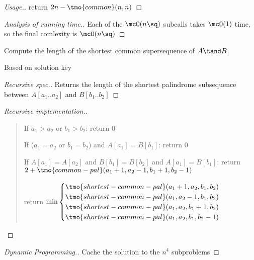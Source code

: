 \documentclass{article}
\begin{document}
\begin{proof}[Usage.]
return $ 2n - \tmo{common}(n,n) $
\end{proof}

\begin{proof}[Analysis of running time.]
Each of the $ \mcO(n\sq) $ subcalls takes $ \mcO(1) $ time, so the final comlexity is $ \mcO(n\sq) $
\end{proof}
\pagebreak

\begin{subexercise} %
  Compute the length of the shortest common supersequence of $A \tand B$.
\end{subexercise}

\begin{note}
  Based on solution key
\end{note}

\begin{proof}[Recursive spec.]
  Returns the length of the shortest palindrome subsequence between $ A[a_1..a_2] $ and $ B[b_1..b_2] $
\end{proof}

\begin{proof}[Recursive implementation.]\
\begin{quote}
\begin{steps}
  \item If $ a_1 > a_2 $ or $ b_1 > b_2 $: return 0
  \item If ($ a_1 = a_2 $ or $ b_1 = b_2 $) and $ A[a_1] = B[b_1] $: return 0
  \item If $ A[a_1] = A[a_2] $ and $ B[b_1] = B[b_2] $ and $ A[a_1] = B[b_1] $: return $ 2+\tmo{common-pal}(a_1+1, a_2-1, b_1+1, b_2-1) $
  \item return $\min\begin{cases}
    \tmo{shortest-common-pal}(a_1+1,a_2,b_1,b_2) \\
    \tmo{shortest-common-pal}(a_1,a_2-1,b_1,b_2) \\
    \tmo{shortest-common-pal}(a_1,a_2,b_1+1,b_2) \\
    \tmo{shortest-common-pal}(a_1,a_2,b_1,b_2-1)
  \end{cases}$
\end{steps}
\end{quote}
\end{proof}

\begin{proof}[Dynamic Programming.]
  Cache the solution to the $ n^4 $ subproblems
\end{proof}
\end{document}
